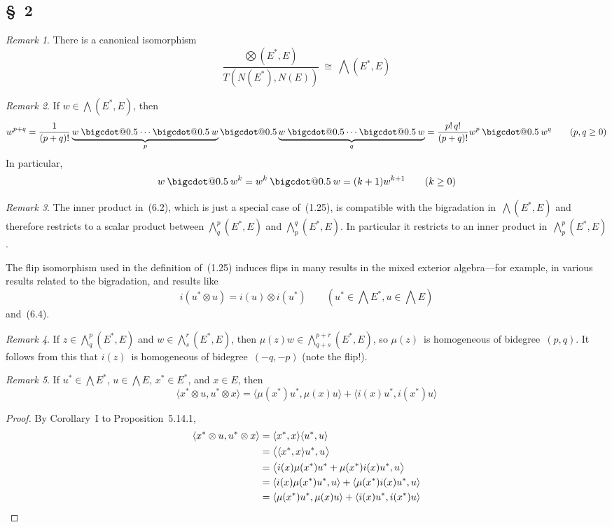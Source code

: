 \documentclass[letterpaper,12pt]{article}
\makeatletter
\newcommand{\iso}{\cong}
\newcommand{\bigcdot}[1]{\mathbin{\mathpalette\bigcdot@{#1}}}
\newcommand{\bigcdot@}[2]{%
  \sbox0{$#1\vcenter{}$}%
  \sbox2{$#1\cdot\m@th$}%
  \hbox{%
    \hfil
    \raise\ht0\hbox{%
      \scalebox{#2}{%
        \lower\ht0\hbox{$#1\bullet\m@th$}%
      }%
    }%
    \hfil
  }%
}
\newcommand{\tprod}{\otimes}
\newcommand{\bigtprod}{\bigotimes}
\newcommand{\medtprod}{{\textstyle\bigtprod}}
\newcommand{\bigeprod}{\bigwedge}
\newcommand{\medeprod}{{\textstyle\bigeprod}}
\newcommand{\mprod}{\bigcdot{0.5}}
\newcommand{\sprod}[2]{\langle#1,#2\rangle}
\newcommand{\bigsprod}[2]{\big\langle#1,#2\big\rangle}
\newcommand{\multi}[4]{#2_{#3}#1\cdots#1#2_{#4}}
\newcommand{\mprods}[3]{\multi{\mprod}{#1}{#2}{#3}}
\theoremstyle{definition}
\theoremstyle{remark}
\newtheorem*{rmk}{Remark}
\makeatother
\begin{document}
\subsection*{\S~2}
\begin{rmk}
There is a canonical isomorphism
\[\frac{\medtprod(E^*,E)}{T(N(E^*),N(E))}\ \iso\ \medeprod(E^*,E)\]
\end{rmk}

\begin{rmk}
If \(w\in\medeprod(E^*,E)\), then
\[w^{p+q}=\frac{1}{(p+q)!}\underbrace{\mprods{w}{}{}}_p\mprod\underbrace{\mprods{w}{}{}}_q=\frac{p!\,q!}{(p+q)!}w^p\mprod w^q\qquad(p,q\ge 0)\]
In particular,
\[w\mprod w^k=w^k\mprod w=(k+1)w^{k+1}\qquad(k\ge 0)\]
\end{rmk}

\begin{rmk}
The inner product in~(6.2), which is just a special case of~(1.25), is compatible with the bigradation in~\(\medeprod(E^*,E)\) and therefore restricts to a scalar product between \(\medeprod^p_q(E^*,E)\) and \(\medeprod^q_p(E^*,E)\). In particular it restricts to an inner product in~\(\medeprod^p_p(E^*,E)\).

The flip isomorphism used in the definition of~(1.25) induces flips in many results in the mixed exterior algebra---for example, in various results related to the bigradation, and results like
\[i(u^*\tprod u)=i(u)\tprod i(u^*)\qquad(u^*\in\medeprod E^*,u\in\medeprod E)\]
and~(6.4).
\end{rmk}

\begin{rmk}
If \(z\in\medeprod^p_q(E^*,E)\) and \(w\in\medeprod^r_s(E^*,E)\), then \(\mu(z)w\in\medeprod^{p+r}_{q+s}(E^*,E)\), so \(\mu(z)\)~is homogeneous of bidegree~\((p,q)\). It follows from this that \(i(z)\)~is homogeneous of bidegree~\((-q,-p)\) (note the flip!).
\end{rmk}

\begin{rmk}
If \(u^*\in\medeprod E^*\), \(u\in\medeprod E\), \(x^*\in E^*\), and \(x\in E\), then
\[\sprod{x^*\tprod u}{u^*\tprod x}=\sprod{\mu(x^*)u^*}{\mu(x)u}+\sprod{i(x)u^*}{i(x^*)u}\]
\end{rmk}
\begin{proof}
By Corollary~I to Proposition~5.14.1,
\begin{align*}
\sprod{x^*\tprod u}{u^*\tprod x}&=\sprod{x^*}{x}\sprod{u^*}{u}\\
	&=\bigsprod{\sprod{x^*}{x}u^*}{u}\\
	&=\bigsprod{i(x)\mu(x^*)u^*+\mu(x^*)i(x)u^*}{u}\\
	&=\sprod{i(x)\mu(x^*)u^*}{u}+\sprod{\mu(x^*)i(x)u^*}{u}\\
	&=\sprod{\mu(x^*)u^*}{\mu(x)u}+\sprod{i(x)u^*}{i(x^*)u}\qedhere
\end{align*}
\end{proof}
\end{document}
